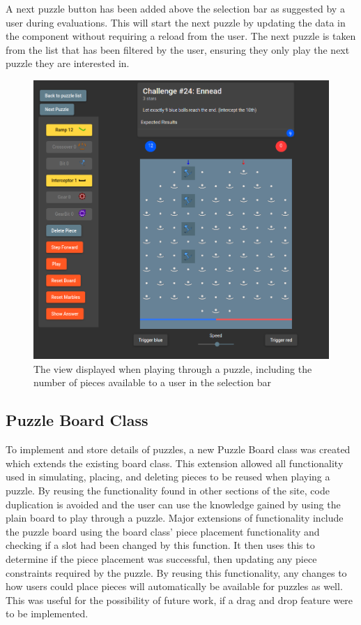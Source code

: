 \documentclass{l4proj}
\begin{document}
A next puzzle button has been added above the selection bar as suggested by a user during evaluations. This will start the next puzzle by updating the data in the component without requiring a reload from the user. The next puzzle is taken from the list that has been filtered by the user, ensuring they only play the next puzzle they are interested in.

\begin{figure}
    \centering
    \includegraphics[width=0.65\linewidth]{images/puzzle.png}
    \caption{The view displayed when playing through a puzzle, including the number of pieces available to a user in the selection bar}
    \label{fig:puzzle}
\end{figure}

\subsection{Puzzle Board Class}
\label{section:puzzle-board-class}
To implement and store details of puzzles, a new Puzzle Board class was created which extends the existing board class. This extension allowed all functionality used in simulating, placing, and deleting pieces to be reused when playing a puzzle. By reusing the functionality found in other sections of the site, code duplication is avoided and the user can use the knowledge gained by using the plain board to play through a puzzle. Major extensions of functionality include the puzzle board using the board class' piece placement functionality and checking if a slot had been changed by this function. It then uses this to determine if the piece placement was successful, then updating any piece constraints required by the puzzle. By reusing this functionality, any changes to how users could place pieces will automatically be available for puzzles as well. This was useful for the possibility of future work, if a drag and drop feature were to be implemented. 
\end{document}

